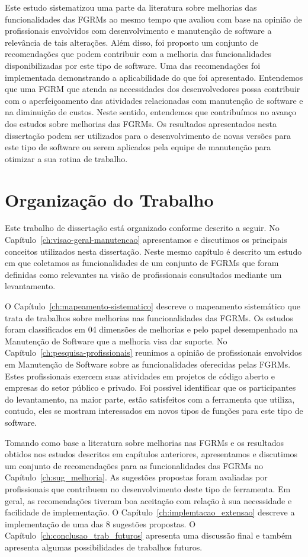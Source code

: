 Este estudo sistematizou uma parte da literatura sobre melhorias das
funcionalidades das FGRMs ao mesmo tempo que avaliou com base na opinião de
profissionais envolvidos com desenvolvimento e manutenção de software a
relevância de tais alterações. Além disso, foi proposto um conjunto de
recomendações que podem contribuir com a melhoria das funcionalidades
disponibilizadas por este tipo de software. Uma das recomendações foi
implementada demonstrando a aplicabilidade do que foi apresentado. Entendemos
que uma FGRM que atenda as necessidades dos desenvolvedores possa contribuir
com o aperfeiçoamento das atividades relacionadas com manutenção de software e
na diminuição de custos. Neste sentido, entendemos que contribuímos no avanço
dos estudos sobre melhorias das FGRMs. Os resultados apresentados nesta
dissertação podem ser utilizados para o desenvolvimento de novas versões para
este tipo de software ou serem aplicados pela equipe de manutenção para
otimizar a sua rotina de trabalho.

\section{Organização do Trabalho}\label{sec:intro-organizacao-dissertacao}

Este trabalho de dissertação está organizado conforme descrito a seguir. No
Capítulo~\ref{ch:visao-geral-manutencao} apresentamos e discutimos os principais
conceitos utilizados nesta dissertação. Neste mesmo capítulo é descrito um
estudo em que coletamos as funcionalidades de um conjunto de FGRMs que foram
definidas como relevantes na visão de profissionais consultados mediante um
levantamento.

O Capítulo~\ref{ch:mapeamento-sistematico} descreve o mapeamento sistemático que
trata de trabalhos sobre melhorias nas funcionalidades das FGRMs. Os estudos
foram classificados em 04 dimensões de melhorias e pelo papel desempenhado na
Manutenção de Software que a melhoria visa dar suporte. No
Capítulo~\ref{ch:pesquisa-profissionais} reunimos a opinião de profissionais
envolvidos em Manutenção de Software sobre as funcionalidades oferecidas pelas
FGRMs. Estes profissionais exercem suas atividades em projetos de código aberto
e empresas do setor público e privado. Foi possível identificar que os
participantes do levantamento, na maior parte, estão satisfeitos com a
ferramenta que utiliza, contudo, eles se mostram interessados em novos tipos de
funções para este tipo de software.

Tomando como base a literatura sobre melhorias nas FGRMs e os resultados
obtidos nos estudos descritos em capítulos anteriores, apresentamos e
discutimos um conjunto de recomendações para as funcionalidades das FGRMs no
Capítulo~\ref{ch:sug_melhoria}. As sugestões propostas foram avaliadas por
profissionais que contribuem no desenvolvimento deste tipo de ferramenta. Em
geral, as recomendações tiveram boa aceitação com relação à sua necessidade e
facilidade de implementação. O Capítulo~\ref{ch:implemtacao_extensao} descreve
a implementação de uma das 8 sugestões propostas. O
Capítulo~\ref{ch:conclusao_trab_futuros} apresenta uma discussão final e também
apresenta algumas possibilidades de trabalhos futuros.
